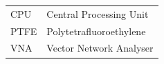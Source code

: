 

\inserttitlelistofabbreviations

{\hskip-3mm
\begin{tabular}{>{\rmfamily\normalsize}p{20mm} >{\rmfamily\normalsize}p{127mm}} %

CPU & Central Processing Unit \\
PTFE & Polytetrafluoroethylene \\
VNA & Vector Network Analyser \\

\end{tabular}
}

